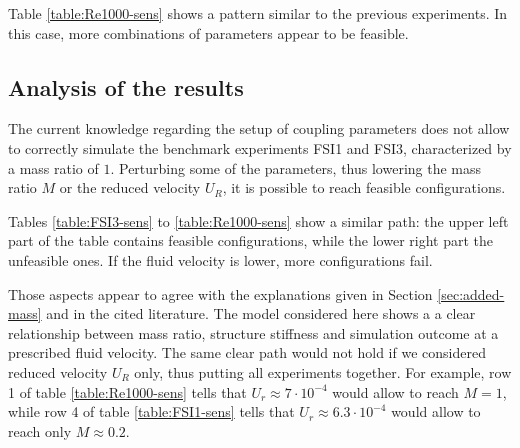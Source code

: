 Table \ref{table:Re1000-sens} shows a pattern similar to the previous experiments. In this case, more combinations of parameters appear to be feasible. 

\subsection{Analysis of the results}

The current knowledge regarding the setup of coupling parameters does not allow to correctly simulate the benchmark experiments FSI1 and FSI3, characterized by a mass ratio of $1$. Perturbing some of the parameters, thus lowering the mass ratio $M$ or the reduced velocity $U_R$, it is possible to reach feasible configurations. 

Tables \ref{table:FSI3-sens} to \ref{table:Re1000-sens} show a similar path: the upper left part of the table contains feasible configurations, while the lower right part the unfeasible ones. If the fluid velocity is lower, more configurations fail.

Those aspects appear to agree with the explanations given in Section \ref{sec:added-mass} and in the cited literature. The model considered here shows a a clear relationship between mass ratio, structure stiffness and simulation outcome at a prescribed fluid velocity. The same clear path would not hold if we considered reduced velocity $U_R$ only, thus putting all experiments together. For example, row 1 of table \ref{table:Re1000-sens} tells that $U_r \approx 7\cdot 10^{-4}$ would allow to reach $M=1$, while row 4 of table \ref{table:FSI1-sens} tells that $U_r \approx 6.3\cdot 10^{-4}$ would allow to reach only $M\approx0.2$. 